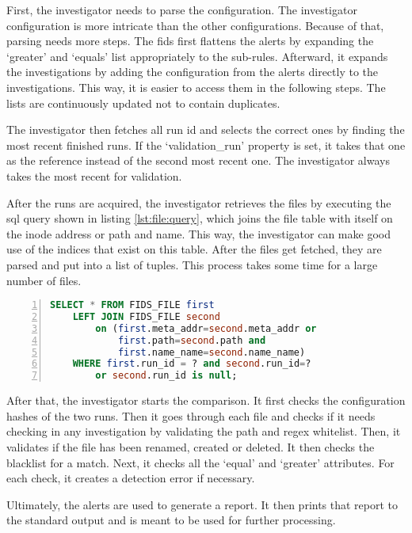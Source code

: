 First, the investigator needs to parse the configuration. The investigator configuration is more intricate than the other configurations. Because of that, parsing needs more steps. The \gls{fids} first flattens the alerts by expanding the `greater' and `equals' list appropriately to the sub-rules. Afterward, it expands the investigations by adding the configuration from the alerts directly to the investigations. This way, it is easier to access them in the following steps. The lists are continuously updated not to contain duplicates.

The investigator then fetches all run \gls{id} and selects the correct ones by finding the most recent finished runs. If the `validation\_run' property is set, it takes that one as the reference instead of the second most recent one. The investigator always takes the most recent for validation.

After the runs are acquired, the investigator retrieves the files by executing the \gls{sql} query shown in listing \ref{lst:file:query}, which joins the file table with itself on the inode address or path and name. This way, the investigator can make good use of the indices that exist on this table. After the files get fetched, they are parsed and put into a list of tuples. This process takes some time for a large number of files. 

\begin{lstlisting}[language=sql, numbers=left, caption=SQL Querry for files, label=lst:file:query]
SELECT * FROM FIDS_FILE first 
    LEFT JOIN FIDS_FILE second 
        on (first.meta_addr=second.meta_addr or 
            first.path=second.path and 
            first.name_name=second.name_name)
    WHERE first.run_id = ? and second.run_id=? 
        or second.run_id is null;
\end{lstlisting}

After that, the investigator starts the comparison. It first checks the configuration hashes of the two runs. Then it goes through each file and checks if it needs checking in any investigation by validating the path and \gls{regex} whitelist. Then, it validates if the file has been renamed, created or deleted. It then checks the blacklist for a match.  Next, it checks all the `equal' and `greater' attributes. For each check, it creates a detection error if necessary. 

Ultimately, the alerts are used to generate a report. It then prints that report to the standard output and is meant to be used for further processing. 

